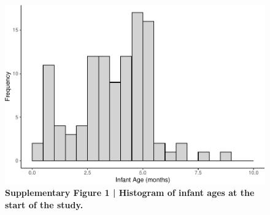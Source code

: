 \documentclass[
]{article}
\begin{document}
\begin{figure}[H]

{\centering \includegraphics[width=1\linewidth,]{MIPH_childdev_files/figure-latex/supp figure 1-1} 

}

\caption{\textbf{Supplementary Figure 1 | Histogram of infant ages at the start of the study.}}\label{fig:supp figure 1}
\end{figure}
\clearpage
\end{document}
